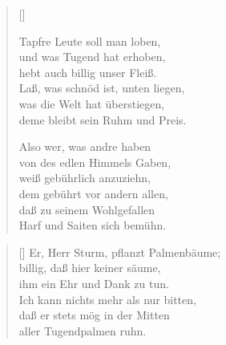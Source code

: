 \begin{multicols}{2}
\settowidth{\versewidth}{Er, Herr Sturm, pflanzt Palmenbäume;}
\begin{verse}[\versewidth]

 Tapfre Leute soll man loben,\\
und was Tugend hat erhoben,\\
hebt auch billig unser Fleiß.\\
Laß, was schnöd ist, unten liegen,\\
was die Welt hat überstiegen,\\
deme bleibt sein Ruhm und Preis.

 Also wer, was andre haben\\
von des edlen Himmels Gaben,\\
weiß gebührlich anzuziehn,\\
dem gebührt vor andern allen,\\
daß zu seinem Wohlgefallen\\
Harf und Saiten sich bemühn.
\end{verse}
\end{multicols}

\begin{center}
\settowidth{\versewidth}{Er, Herr Sturm, pflanzt Palmenbäume;}
\begin{verse}[\versewidth]  
 Er, Herr Sturm, pflanzt Palmenbäume;\\
billig, daß hier keiner säume,\\
ihm ein Ehr und Dank zu tun.\\
Ich kann nichts mehr als nur bitten,\\
daß er stets mög in der Mitten\\
aller Tugendpalmen ruhn.

\end{verse}
\end{center}
